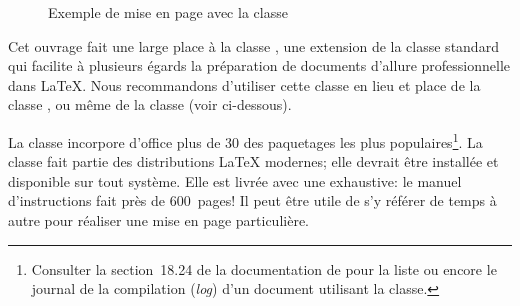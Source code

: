 \begin{figure}
\begin{minipage}{0.49\linewidth}
  \end{minipage}
  \caption{Exemple de mise en page avec la classe }
  \label{fig:organisation:classes:book}
\end{figure}

Cet ouvrage fait une large place à la classe 
\citep{memoir}, une extension de la classe standard  qui
facilite à plusieurs égards la préparation de documents d'allure
professionnelle dans {\LaTeX}. Nous recommandons d'utiliser cette
classe en lieu et place de la classe , ou même de la
classe  (voir ci-dessous).

La classe  incorpore d'office plus de 30 des paquetages
les plus populaires\footnote{%
  Consulter la section~18.24 de la documentation de 
  pour la liste ou encore le journal de la compilation (\emph{log})
  d'un document utilisant la classe.}. %
La classe fait partie des distributions {\LaTeX} modernes; elle
devrait être installée et disponible sur tout système. Elle est livrée
avec une %
exhaustive: le manuel d'instructions fait près de 600~pages! Il peut
être utile de s'y référer de temps à autre pour réaliser une mise en
page particulière.

